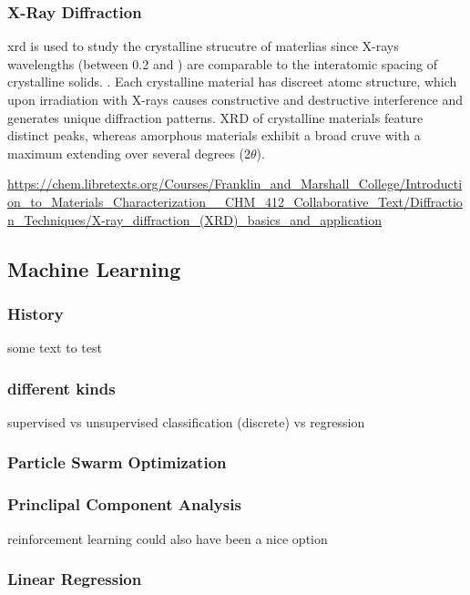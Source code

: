 \subsubsection{X-Ray Diffraction}
\gls{xrd} is used to study the crystalline strucutre of materlias since X-rays wavelengths (between 0.2 and ) are comparable to the interatomic spacing of crystalline solids.  \cite{Kaliva2020}.
Each crystalline material has discreet atomc structure, which upon irradiation with X-rays causes constructive and destructive interference and generates unique diffraction patterns. 
XRD  of crystalline materials feature distinct peaks, whereas amorphous materials exhibit a broad cruve with a maximum extending over several degrees (2$\theta$).

\url{https://chem.libretexts.org/Courses/Franklin_and_Marshall_College/Introduction_to_Materials_Characterization__CHM_412_Collaborative_Text/Diffraction_Techniques/X-ray_diffraction_(XRD)_basics_and_application}\\


\subsection{Machine Learning}
\subsubsection{History}
some text to test
\subsubsection{different kinds} 
supervised vs unsupervised
classification (discrete) vs regression
\subsubsection{Particle Swarm Optimization}
\subsubsection{Princlipal Component Analysis}
reinforcement learning could also have been a nice option
\subsubsection{Linear Regression}
